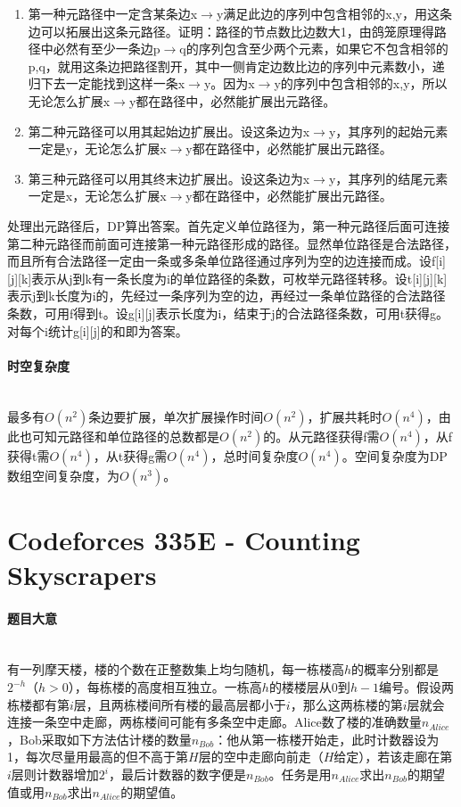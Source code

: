 \documentclass[UTF8]{ctexart}
\newcommand{\myparagraph}[1]{\paragraph{#1}\mbox{}\\}
\theoremstyle{nonumberplain}
\begin{document}
			\begin{enumerate}
				\item 第一种元路径中一定含某条边x$\rightarrow$y满足此边的序列中包含相邻的x,y，用这条边可以拓展出这条元路径。证明：路径的节点数比边数大1，由鸽笼原理得路径中必然有至少一条边p$\rightarrow$q的序列包含至少两个元素，如果它不包含相邻的p,q，就用这条边把路径割开，其中一侧肯定边数比边的序列中元素数小，递归下去一定能找到这样一条x$\rightarrow$y。因为x$\rightarrow$y的序列中包含相邻的x,y，所以无论怎么扩展x$\rightarrow$y都在路径中，必然能扩展出元路径。
				\item 第二种元路径可以用其起始边扩展出。设这条边为x$\rightarrow$y，其序列的起始元素一定是y，无论怎么扩展x$\rightarrow$y都在路径中，必然能扩展出元路径。
				\item 第三种元路径可以用其终末边扩展出。设这条边为x$\rightarrow$y，其序列的结尾元素一定是x，无论怎么扩展x$\rightarrow$y都在路径中，必然能扩展出元路径。
			\end{enumerate}
			
			处理出元路径后，DP算出答案。首先定义单位路径为，第一种元路径后面可连接第二种元路径而前面可连接第一种元路径形成的路径。显然单位路径是合法路径，而且所有合法路径一定由一条或多条单位路径通过序列为空的边连接而成。设f[i][j][k]表示从j到k有一条长度为i的单位路径的条数，可枚举元路径转移。设t[i][j][k]表示j到k长度为i的，先经过一条序列为空的边，再经过一条单位路径的合法路径条数，可用f得到t。设g[i][j]表示长度为i，结束于j的合法路径条数，可用t获得g。对每个i统计g[i][j]的和即为答案。
		
		\myparagraph{时空复杂度}
		
			最多有$O(n^2)$条边要扩展，单次扩展操作时间$O(n^2)$，扩展共耗时$O(n^4)$，由此也可知元路径和单位路径的总数都是$O(n^2)$的。从元路径获得f需$O(n^4)$，从f获得t需$O(n^4)$，从t获得g需$O(n^4)$，总时间复杂度$O(n^4)$。空间复杂度为DP数组空间复杂度，为$O(n^3)$。
	
	\section{Codeforces 335E - Counting Skyscrapers}
	
		\myparagraph{题目大意}
		
			有一列摩天楼，楼的个数在正整数集上均匀随机，每一栋楼高$h$的概率分别都是$2^{-h}$（$h>0$），每栋楼的高度相互独立。一栋高$h$的楼楼层从0到$h-1$编号。假设两栋楼都有第$i$层，且两栋楼间所有楼的最高层都小于$i$，那么这两栋楼的第$i$层就会连接一条空中走廊，两栋楼间可能有多条空中走廊。Alice数了楼的准确数量$n_{Alice}$，Bob采取如下方法估计楼的数量$n_{Bob}$：他从第一栋楼开始走，此时计数器设为1，每次尽量用最高的但不高于第$H$层的空中走廊向前走（$H$给定），若该走廊在第$i$层则计数器增加$2^i$，最后计数器的数字便是$n_{Bob}$。任务是用$n_{Alice}$求出$n_{Bob}$的期望值或用$n_{Bob}$求出$n_{Alice}$的期望值。
		
\end{document}
